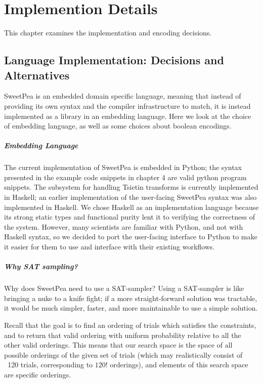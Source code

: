 
\chapter{Implemention Details}

This chapter examines the implementation and encoding decisions.

\section{Language Implementation: Decisions and Alternatives}

SweetPea is an embedded domain specific language, meaning that instead of providing its own syntax and the compiler infrastructure to match, it is instead implemented as a library in an embedding language. Here we look at the choice of embedding language, as well as some choices about boolean encodings.

\paragraph*{Embedding Language}

The current implementation of SweetPea is embedded in Python; the syntax presented in the example code snippets in chapter 4 are valid python program snippets. The subsystem for handling Tsietin transforms is currently implemented in Haskell; an earlier implementation of the user-facing SweetPea syntax was also implemented in Haskell. We chose Haskell as an implementation language because its strong static types and functional purity lent it to verifying the correctness of the system. However, many scientists are familiar with Python, and not with Haskell syntax, so we decided to port the user-facing interface to Python to make it easier for them to use and interface with their existing workflows.

\paragraph*{Why SAT sampling?}

Why does SweetPea need to use a SAT-sampler? Using a SAT-sampler is like bringing a nuke to a knife fight; if a more straight-forward solution was tractable, it would be much simpler, faster, and more maintainable to use a simple solution.

Recall that the goal is to find an ordering of trials which satisfies the constraints, and to return that valid ordering with uniform probability relative to all the other valid orderings. This means that our search space is the space of all possible orderings of the given set of trials (which may realistically consist of \texttt{~}120 trials, corresponding to $120!$ orderings), and elements of this search space are specific orderings.

